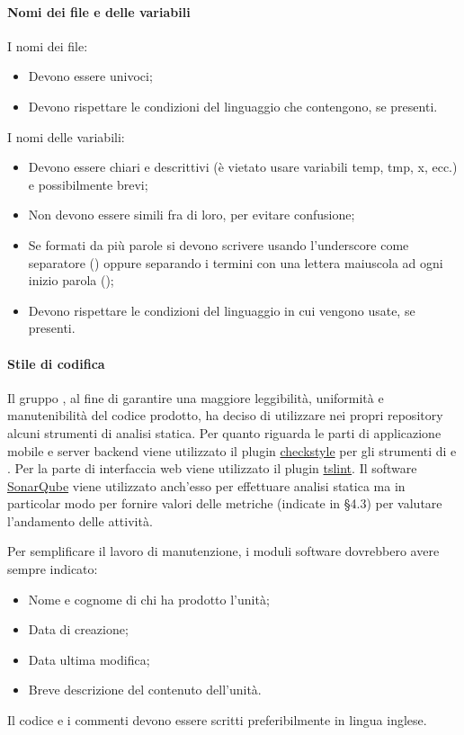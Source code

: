 \paragraph{Nomi dei file e delle variabili}
I nomi dei file:
\begin{itemize}
    \item Devono essere univoci;
    \item Devono rispettare le condizioni del linguaggio che contengono, se presenti.
\end{itemize}
I nomi delle variabili:
\begin{itemize}
    \item Devono essere chiari e descrittivi (è vietato usare variabili temp, tmp, x, ecc.) e possibilmente brevi;
    \item Non devono essere simili fra di loro, per evitare confusione;
    \item Se formati da più parole si devono scrivere usando l'underscore come separatore () oppure separando i termini con una lettera maiuscola ad ogni inizio parola ();
    \item Devono rispettare le condizioni del linguaggio in cui vengono usate, se presenti.
\end{itemize}

\paragraph{Stile di codifica}
Il gruppo \Gruppo{}, al fine di garantire una maggiore leggibilità, uniformità e manutenibilità del codice prodotto, ha deciso di utilizzare nei propri repository alcuni strumenti di analisi statica.
Per quanto riguarda le parti di applicazione mobile e server backend viene utilizzato il plugin \href{https://checkstyle.sourceforge.io}{checkstyle} per gli strumenti di   e .
Per la parte di interfaccia web viene utilizzato il plugin \textbf{} \href{https://palantir.github.io/tslint/}{tslint}.
Il software \href{https://www.sonarqube.org/}{SonarQube} viene utilizzato anch'esso per effettuare analisi statica ma in particolar modo per fornire valori delle metriche (indicate in §4.3) per valutare l'andamento delle attività.

Per semplificare il lavoro di manutenzione, i moduli software dovrebbero avere sempre indicato: 
\begin{itemize}
	\item Nome e cognome di chi ha prodotto l'unità;
	\item Data di creazione;
	\item Data ultima modifica;
	\item Breve descrizione del contenuto dell'unità.
\end{itemize} 

Il codice e i commenti devono essere scritti preferibilmente in lingua inglese.
